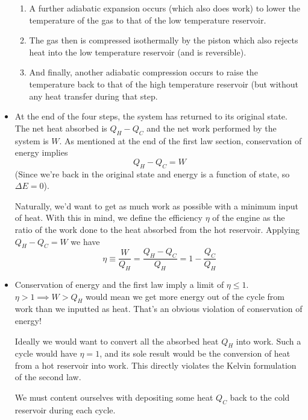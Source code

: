\documentclass[11pt, a4paper]{article}
\begin{document}
\begin{itemize}
\begin{enumerate}
		\item A further adiabatic expansion occurs (which also does work) to lower the temperature of the gas to that of the low temperature reservoir.
		
		\item The gas then is compressed isothermally by the piston which also rejects heat into the low temperature reservoir (and is reversible).
		
		\item And finally, another adiabatic compression occurs to raise the temperature back to that of the high temperature reservoir (but without any heat transfer during that step.
	\end{enumerate}

 
	
	\item At the end of the four steps, the system has returned to its original state. The net heat absorbed is $ Q_{H} - Q_{C} $ and the net work performed by the system is $ W $. As mentioned at the end of the first law section, conservation of energy implies
	\begin{equation*}
		Q_{H} - Q_{C} = W
	\end{equation*}
	(Since we're back in the original state and energy is a function of state, so $ \Delta E = 0 $).
	
	Naturally, we'd want to get as much work as possible with a minimum input of heat. With this in mind, we define the efficiency $ \eta $ of the engine as the ratio of the work done to the heat absorbed from the hot reservoir. Applying $ Q_{H} - Q_{C} = W $ we have
	\begin{equation*}
		\eta \equiv \frac{W}{Q_{H}} = \frac{Q_{H}-Q_{C}}{Q_{H}} = 1 - \frac{Q_{C}}{Q_{H}}
	\end{equation*}

	
	\item Conservation of energy and the first law imply a limit of $ \eta \leq 1$. $ \eta > 1 \implies W > Q_{H} $ would mean we get more energy out of the cycle from work than we inputted as heat. That's an obvious violation of conservation of energy! 
	
	 Ideally we would want to convert all the absorbed heat $ Q_{H} $ into work. Such a cycle would have $ \eta = 1 $, and its sole result would be the conversion of heat from a hot reservoir into work. This directly violates the Kelvin formulation of the second law. 
	 
	 We must content ourselves with depositing some heat $ Q_{C} $ back to the cold reservoir during each cycle. 
	 

\end{itemize}
\end{document}
